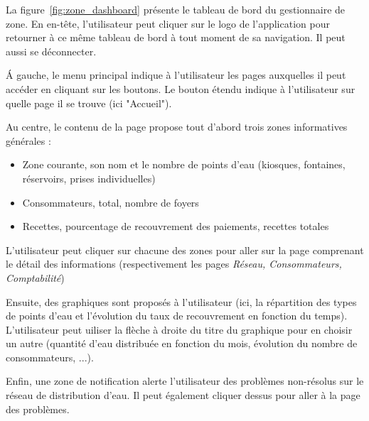\documentclass[a4paper, 11pt]{article}
\begin{document}
    La figure~\ref{fig:zone_dashboard} présente le tableau de bord du gestionnaire de zone. En en-tête, l'utilisateur peut cliquer sur le logo de l'application pour retourner à ce même tableau de bord à tout moment de sa navigation. Il peut aussi se déconnecter.

    \'A gauche, le menu principal indique à l'utilisateur les pages auxquelles il peut accéder en cliquant sur les boutons. Le bouton étendu indique à l'utilisateur sur quelle page il se trouve (ici "Accueil").

    Au centre, le contenu de la page propose tout d'abord trois zones informatives générales :
    \begin{itemize}
      \item Zone courante, son nom et le nombre de points d'eau (kiosques, fontaines, réservoirs, prises individuelles)
      \item Consommateurs, total, nombre de foyers
      \item Recettes, pourcentage de recouvrement des paiements, recettes totales
    \end{itemize}
    L'utilisateur peut cliquer sur chacune des zones pour aller sur la page comprenant le détail des informations (respectivement les pages \emph{Réseau, Consommateurs, Comptabilité})

    Ensuite, des graphiques sont proposés à l'utilisateur (ici, la répartition des types de points d'eau et l'évolution du taux de recouvrement en fonction du temps). L'utilisateur peut uiliser la flèche à droite du titre du graphique pour en choisir un autre (quantité d'eau distribuée en fonction du mois, évolution du nombre de consommateurs, ...).

    Enfin, une zone de notification alerte l'utilisateur des problèmes non-résolus sur le réseau de distribution d'eau. Il peut également cliquer dessus pour aller à la page des problèmes.
\end{document}
